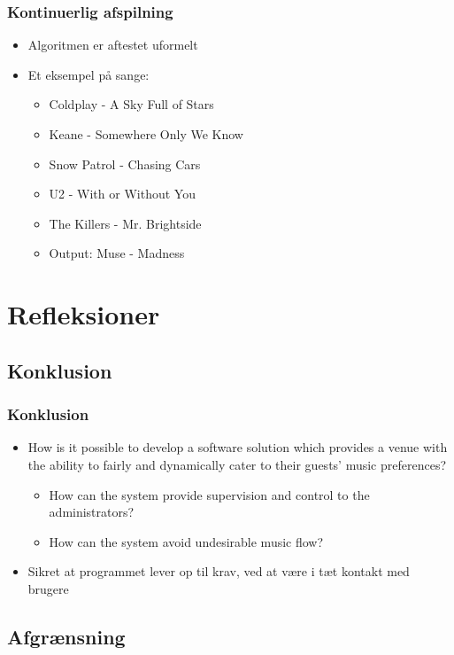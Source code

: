 \begin{frame}
	\frametitle{Kontinuerlig afspilning}
	\begin{itemize}
		\item Algoritmen er aftestet uformelt
		\item Et eksempel på sange:
		\begin{itemize}
		\item Coldplay - A Sky Full of Stars
		\item Keane - Somewhere Only We Know
		\item Snow Patrol - Chasing Cars
		\item U2 - With or Without You
		\item The Killers - Mr. Brightside 
		\item Output: Muse - Madness
		\end{itemize}
	\end{itemize}
\end{frame}



\section{Refleksioner}
\subsection{Konklusion}

\begin{frame}
	\frametitle{Konklusion}
	\begin{itemize}
		\item How is it possible to develop a software solution which provides a venue with the ability to fairly and dynamically cater to their guests’ music preferences?
		\begin{itemize}
			\item How can the system provide supervision and control to the administrators?
			\item How can the system avoid undesirable music flow?
		\end{itemize}
		\item Sikret at programmet lever op til krav, ved at være i tæt kontakt med brugere
	\end{itemize}
\end{frame}
\subsection{Afgrænsning}

